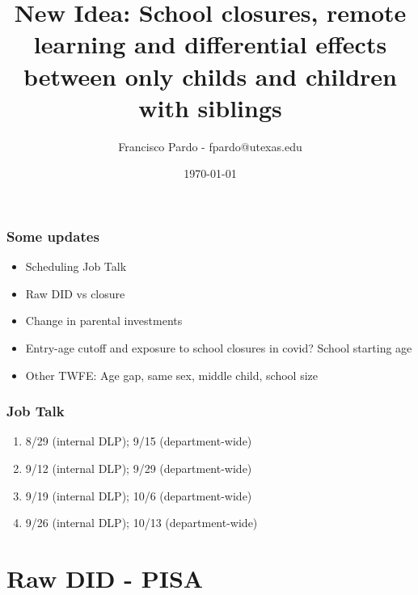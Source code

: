 \documentclass{beamer}
\title[]{New Idea: School closures, remote learning and differential effects between only childs and children with siblings}
\author[Francisco Pardo] %
{Francisco Pardo - fpardo@utexas.edu \inst{1}}
\institute[UT] %
{
  \inst{1}%
  University of Texas at Austin
}
\date{\today}
\begin{document}
\frame{\titlepage}


\begin{frame}
    \label{update_scott}
    \frametitle{Some updates}
    \begin{itemize}
        \item Scheduling Job Talk
        \item Raw DID vs closure 
        \item Change in parental investments
        \item Entry-age cutoff and exposure to school closures in covid? School starting age
        \item Other TWFE: Age gap, same sex, middle child, school size
        
    \end{itemize}
\end{frame}





\begin{frame}
    \label{update_scott}
    \frametitle{Job Talk}
    \begin{enumerate}
        \item 8/29 (internal DLP); 9/15 (department-wide)
        \item 9/12 (internal DLP); 9/29 (department-wide)
        \item 9/19 (internal DLP); 10/6 (department-wide)
        \item 9/26 (internal DLP); 10/13 (department-wide)
    \end{enumerate}
\end{frame}


\section{Raw DID - PISA}
\end{document}
